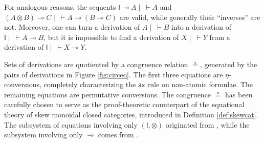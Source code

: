 \documentclass[submission,copyright,creativecommons]{eptcs}
\theoremstyle{definition}
\newcommand{\tl}{\otimes \mathsf{L}}
\newcommand{\ax}{\mathsf{ax}}
\newcommand{\ot}{\otimes}
\newcommand{\lolli}{\multimap}
\newcommand{\I}{\mathsf{I}}
\begin{document}
For analogous reasons, the sequents $\I \lolli A \mid ~ \vdash A$ and $(A \ot B) \lolli C \mid ~ \vdash A \lolli (B \lolli C)$ are valid, while generally their ``inverses'' are not. Moreover, one can turn a derivation of $A \mid ~ \vdash B$ into a derivation of $\I \mid ~ \vdash A \lolli B$, but it is impossible to find a derivation of $X \mid ~ \vdash Y$ from a derivation of $\I \mid ~ \vdash X \lolli Y$.


Sets of derivations are quotiented by a congruence relation $\circeq$, generated by the pairs of derivations in Figure \ref{fig:circeq}. The first three equations are $\eta$-conversions, completely characterizing the $\ax$ rule on non-atomic formulae. The remaining equations are permutative conversions. The congruence $\circeq$ has been carefully chosen to serve as the proof-theoretic counterpart of the equational theory of skew monoidal closed categories, introduced in Definition \ref{def:skewcat}. The subsystem of equations involving only $(\I,\ot)$ originated from \cite{uustalu:sequent:2021}, while the subsystem involving only $\lolli$ comes from \cite{uustalu:deductive:nodate}.
\end{document}
